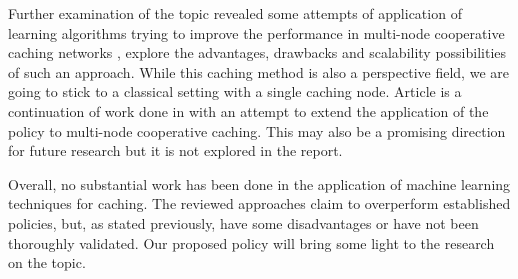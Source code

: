 Further examination of the topic revealed some attempts of application of learning algorithms trying to improve the performance in multi-node cooperative caching networks \cite{19}, explore the advantages, drawbacks and scalability possibilities of such an approach. While this caching method is also a perspective field, we are going to stick to a classical setting with a single caching node. Article \cite{24} is a continuation of work done in \cite{23} with an attempt to extend the application of the policy to multi-node cooperative caching. This may also be a promising direction for future research but it is not explored in the report.

Overall, no substantial work has been done in the application of machine learning techniques for caching. The reviewed approaches claim to overperform established policies, but, as stated previously, have some disadvantages or have not been thoroughly validated. Our proposed policy will bring some light to the research on the topic.